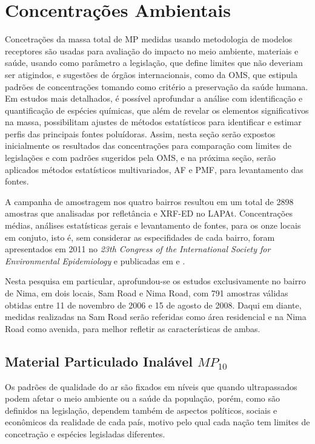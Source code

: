 \newpage
\section{Concentrações Ambientais}

Concetrações da massa total de MP medidas usando metodologia de modelos 
receptores são usadas para avaliação do impacto no 
meio ambiente, materiais e saúde, usando como parâmetro a legislação, que
define limites que não deveriam ser atigindos, e sugestões de órgãos
internacionais, como da OMS, que estipula padrões de concentrações tomando como
critério a preservação da saúde humana. Em estudos mais detalhados, é possível 
aprofundar a análise com identificação e quantificação de espécies químicas, 
que além de revelar os elementos significativos na massa, possibilitam ajustes 
de métodos estatísticos para identificar e estimar perfis das principais 
fontes poluídoras. Assim, nesta seção serão expostos inicialmente os 
resultados das concentrações para comparação com limites de legislações e 
com padrões sugeridos pela OMS, e na próxima seção, serão aplicados métodos 
estatísticos multivariados, AF e PMF, para levantamento das fontes. 

A campanha de amostragem nos quatro bairros resultou em um total de 2898 
amostras que analisadas por refletância e XRF-ED no LAPAt. Concentrações médias, 
análises estatísticas gerais e levantamento de fontes, para os onze locais em 
conjuto, isto é, sem considerar as especifidades de cada bairro, foram 
apresentados em 2011 no \textit{23th Congress of the International Society 
for Environmental Epidemiology} \citep{zhou2011} e publicadas em 
\cite{zhou2013} e \cite{zhou2014}. 

Nesta pesquisa em particular, aprofundou-se os estudos exclusivamente no bairro
de Nima, em dois locais, Sam Road e Nima Road, com 791 amostras válidas obtidas
entre 11 de novembro de 2006 e 15 de agosto de 2008. Daqui em diante, 
medidas realizadas na Sam Road serão referidas como área residencial e na 
Nima Road como avenida, para melhor refletir as características de ambas.

\newpage
\subsection{Material Particulado Inalável $MP_{10}$}

Os padrões de qualidade do ar são fixados em níveis que quando 
ultrapassados podem afetar o meio ambiente ou a saúde da população, porém, 
como são definidos na legislação, dependem também de aspectos políticos, 
sociais e econômicos da realidade de cada país, motivo pelo qual cada nação
tem limites de concetração e espécies legisladas diferentes.

